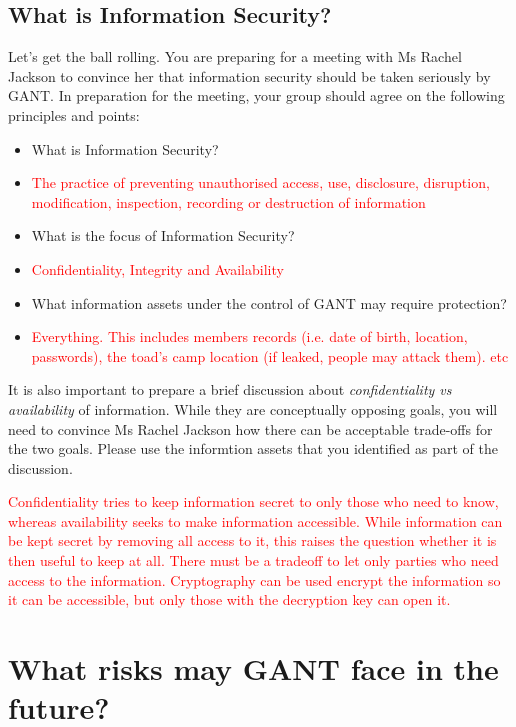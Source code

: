 \documentclass{llncs}
\begin{document}
\subsection{What is Information Security?} 

Let's get the ball rolling. 
You are preparing for a meeting with Ms Rachel Jackson to convince her that information security should be taken seriously by GANT.
In preparation for the meeting, your group should agree on the following principles and points: 

\begin{itemize}
	\item What is Information Security?
	\item \textcolor{red}{The practice of preventing unauthorised access, use, disclosure, disruption, modification, inspection, recording or destruction of information}
	\item What is the focus of Information Security? 
	\item \textcolor{red}{Confidentiality, Integrity and Availability}
	\item What information assets under the control of GANT may require protection? 
	\item \textcolor{red}{Everything. This includes members records (i.e. date of birth, location, passwords), the toad's camp location (if leaked, people may attack them). etc}
\end{itemize}

It is also important to prepare a brief discussion about \textit{confidentiality vs availability} of information.
While they are conceptually opposing goals, you will need to convince Ms Rachel Jackson how there can be acceptable trade-offs for the two goals. 
Please use the informtion assets that you identified as part of the discussion. 

\textcolor{red}{Confidentiality tries to keep information secret to only those who need to know, whereas availability seeks to make information accessible.  While information can be kept secret by removing all access to it, this raises the question whether it is then useful to keep at all. There must be a tradeoff to let only parties who need access to the information. Cryptography can be used encrypt the information so it can be accessible, but only those with the decryption key can open it. }

\section{What risks may GANT face in the future?} 
\end{document}
